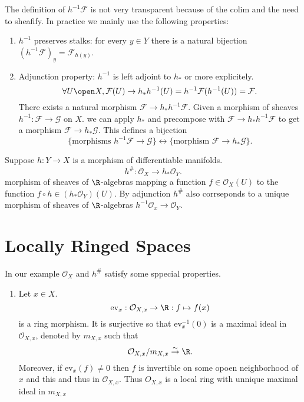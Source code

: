 The definition of  $h^{-1}\mathcal{F} $ is not very transparent because of the colim and the need to sheafify. 
In practice we mainly use the following properties:
\begin{enumerate}
	\item $h^{-1}$ preserves stalks: for every $y \in Y$ there is a natural bijection $(h^{-1} \mathcal{F} )_y = \mathcal{F} _{h(y)}$.
	\item Adjunction property: $h^{-1}$ is left adjoint to $h_*$ or more explicitely.
		\[
			\forall U \open X, \mathcal{F} (U) \to h_* h^{-1}(U) = h^{-1}\mathcal{F} (h^{-1}(U)) = \mathcal{F} 
		.\] 
	There exists a natural morphism $\mathcal{F}  \to h_*h^{-1} \mathcal{F} $.
	Given a morphism of sheaves $h^{-1}: \mathcal{F}  \to \mathcal{G} $ on $X$. we can apply $h_*$ and precompose with $\mathcal{F} \to h_*h^{-1} \mathcal{F} $ to get a morphism $\mathcal{F}  \to h_* \mathcal{G} $.
	This defines a bijection 
	\[
	\{\text{morphisms } h^{-1} \mathcal{F}  \to \mathcal{G} \} \leftrightarrow \{\text{morphism } \mathcal{F} \to h_* \mathcal{G} \}
	.\] 
\end{enumerate}

\begin{example}
	Suppose $h:Y \to X$ is a morphism of differentiable manifolds.\[
	h^\#: \mathcal{O} _X \to h_*\mathcal{O} _Y
	.\]
	morphism of sheaves of $\R$-algebras mapping a function $f \in \mathcal{O} _X(U)$ to the function $f \circ h \in (h_* \mathcal{O} _Y)(U)$.
	By adjunction $h^\#$ also corrseponds to a unique morphism of sheaves of  $\R$-algebras $h^{-1}\mathcal{O} _x \to \mathcal{O} _Y$.
\end{example}

\section{Locally Ringed Spaces} \label{sec:locally_ringed_spaces}
In our example $\mathcal{O} _X$ and $h^\#$ satisfy some sppecial properties.
\begin{enumerate}
	\item Let $x \in X$. \[
			\text{ev}_x: \mathcal{O} _{X,x} \to \R: f \mapsto f(x)
	\]
	is  a ring morphism.
	It is surjective so that $\text{ev}_x^{-1}(0)$ is a maximal ideal in $\mathcal{O} _{X,x}$, denoted by $m_{X,x}$ such that \[
		\mathcal{O} _{X,x} / m_{X, x} \overset{\sim}\to \R
	.\] 
	Moreover, if $\text{ev}_x(f) \ne 0$ then $f$ is invertible on some opoen neighborhood of $x$ and this and thus in $\mathcal{O} _{X,x}$. Thus $O_{X,x}$ is a local ring with unnique maximal ideal in $m_{X,x}$
\end{enumerate}

